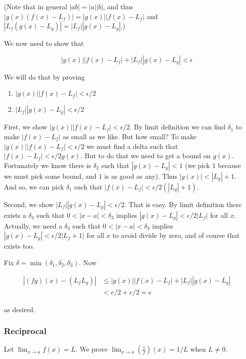 (Note that in general $|ab|=|a||b|$, and thus
$|g(x)(f(x)-L_f)|=|g(x)||f(x)-L_f|$ and
$|L_f(g(x)-L_g)|=|L_f||g(x)-L_g|$.)

\vs

We now need to show that

\[|g(x)||f(x)-L_f|+|L_f||g(x)-L_g|<\epsilon\]

We will do that by proving

\begin{enumerate}
    \item $|g(x)||f(x)-L_f|<\epsilon/2$
    \item $|L_f||g(x)-L_g|<\epsilon/2$
\end{enumerate}

First, we show $|g(x)||f(x)-L_f|<\epsilon/2$. By limit definition we can find
$\delta_1$ to make $|f(x)-L_f|$ as small as we like. But how small? To make
$|g(x)||f(x)-L_f|<\epsilon/2$ we must find a delta such that
$|f(x)-L_f|<\epsilon/2g(x)$. But to do that we need to get a bound on
$g(x)$. Fortunately we know there is $\delta_2$ such that
$|g(x)-L_g|<1$ (we pick $1$ because we must pick some bound, and $1$
is as good as any). Thus $|g(x)|<|L_g|+1$. And so, we can pick
$\delta_1$ such that $|f(x)-L_f|<\epsilon/2(|L_g|+1)$.

\vs

Second, we show $|L_f||g(x)-L_g|<\epsilon/2$. That is easy. By limit
definition there exists a $\delta_3$ such that $0<|x-a|<\delta_3$ implies
$|g(x)-L_g|<\epsilon/2|L_f|$ for all $x$. Actually, we need a
$\delta_3$ such that $0<|x-a|<\delta_3$ implies
$|g(x)-L_g|<\epsilon/2|L_f+1|$ for all $x$ to avoid divide by zero, and of
course that exists too.

\vs

Fix $\delta=\min(\delta_1, \delta_2, \delta_3)$. Now

\begin{align*}
    |(fg)(x)-(L_fL_g)|&\leq |g(x)||f(x)-L_f|+|L_f||g(x)-L_g|\\
    &<e/2+e/2=e
\end{align*}

as desired.

\subsubsection{Reciprocal}

Let $\lim_{x\to a}f(x)=L$. We prove $\lim_{x\to a}\left(\frac{1}{f}\right)(x)=1/L$ when $L\neq 0$.

\vs

